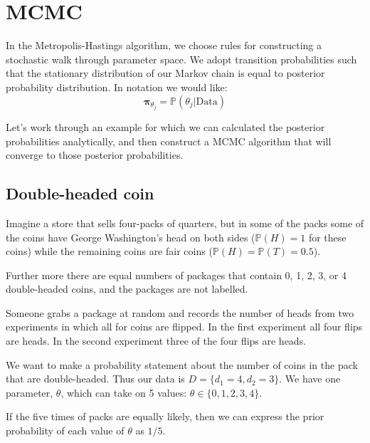 \documentclass[11pt]{article}
\renewcommand{\Pr}{{\mathbb P}}
\begin{document}
\section*{MCMC}
In the Metropolis-Hastings algorithm, we choose rules for constructing a stochastic walk through parameter space.
We adopt transition probabilities such that the stationary distribution of our Markov chain is equal to posterior probability distribution.
In notation we would like:
$$ \bm \pi_{\theta_j} = \Pr(\theta_j|\mbox{Data})$$

Let's work through an example for which we can calculated the posterior probabilities analytically, and then construct a MCMC algorithm that will converge to those posterior probabilities.

\subsection*{Double-headed coin}
Imagine a store that sells four-packs of quarters, but in some of the packs some of the coins have George Washington's head on both sides ($\Pr(H) = 1$ for these coins) while the remaining coins are fair coins ($\Pr(H)  = \Pr(T)  = 0.5$).

Further more there are equal numbers of packages that contain 0, 1, 2, 3, or 4 double-headed coins, and the packages are not labelled.

Someone grabs a package at random and records the number of heads from two experiments in which all for coins are flipped.
In the first experiment all four flips are heads.
In the second experiment three of the four flips are heads.

We want to make a probability statement about the number of coins in the pack that are double-headed.
Thus our data is $D=\{d_1=4, d_2=3\}$.
We have one parameter, $\theta$, which can take on 5 values: $\theta\in\{0,1,2,3,4\}$. 

If the five times of packs are equally likely, then we can express the prior probability of each value of $\theta$ as $1/5$.
\end{document}
